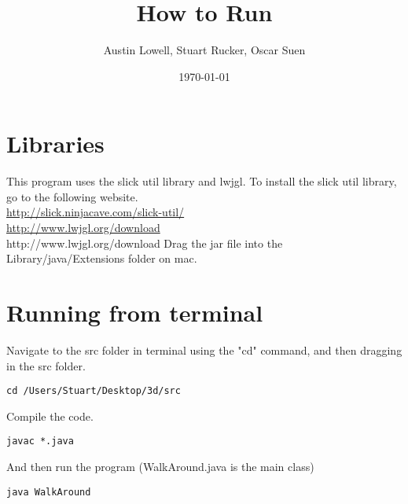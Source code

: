 \documentclass[12pt]{article}
\title{How to Run}
\author{Austin Lowell, Stuart Rucker, Oscar Suen}
\date{\today}
\begin{document}
\maketitle
\section{Libraries}
This program uses the slick util library and lwjgl. To install the slick util library, go to the following website.\\
\href{http://slick.ninjacave.com/slick-util/}{http://slick.ninjacave.com/slick-util/}\\
\href{http://www.lwjgl.org/download}{http://www.lwjgl.org/download}\\
http://www.lwjgl.org/download
Drag the jar file into the Library/java/Extensions folder on mac.
\section{Running from terminal}
Navigate to the src folder in terminal using the "cd" command, and then dragging in the src folder.
\begin{lstlisting}
cd /Users/Stuart/Desktop/3d/src 
\end{lstlisting} 
Compile the code.
\begin{lstlisting}
javac *.java
\end{lstlisting} 
And then run the program (WalkAround.java is the main class)
\begin{lstlisting}
java WalkAround
\end{lstlisting} 
\end{document}
